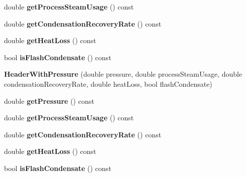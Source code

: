 \begin{DoxyCompactItemize}
double {\bfseries get\+Process\+Steam\+Usage} () const
\item 
\mbox{\label{class_header_with_pressure_a279f3984f0db41e8e8196666500962b4}} 
double {\bfseries get\+Condensation\+Recovery\+Rate} () const
\item 
\mbox{\label{class_header_with_pressure_a3278843587f68c6dd2039fbc9c4eabac}} 
double {\bfseries get\+Heat\+Loss} () const
\item 
\mbox{\label{class_header_with_pressure_a6ee4ff5cbe7360a8fcefd149332f2696}} 
bool {\bfseries is\+Flash\+Condensate} () const
\item 
\mbox{\label{class_header_with_pressure_aa5e01eb051c6e4629d4e92db6165fc52}} 
{\bfseries Header\+With\+Pressure} (double pressure, double process\+Steam\+Usage, double condensation\+Recovery\+Rate, double heat\+Loss, bool flash\+Condensate)
\item 
\mbox{\label{class_header_with_pressure_a96ca85665be1791af322d3dceae12391}} 
double {\bfseries get\+Pressure} () const
\item 
\mbox{\label{class_header_with_pressure_af7a66e40970a72840c78ae39c33dd656}} 
double {\bfseries get\+Process\+Steam\+Usage} () const
\item 
\mbox{\label{class_header_with_pressure_a279f3984f0db41e8e8196666500962b4}} 
double {\bfseries get\+Condensation\+Recovery\+Rate} () const
\item 
\mbox{\label{class_header_with_pressure_a3278843587f68c6dd2039fbc9c4eabac}} 
double {\bfseries get\+Heat\+Loss} () const
\item 
\mbox{\label{class_header_with_pressure_a6ee4ff5cbe7360a8fcefd149332f2696}} 
bool {\bfseries is\+Flash\+Condensate} () const
\end{DoxyCompactItemize}
